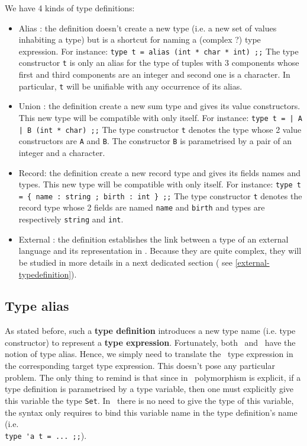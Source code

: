 We have 4 kinds of type definitions:
\begin{itemize}
  \item Alias : the definition doesn't create a new type (i.e. a new
    set of values inhabiting a type) but is a shortcut for naming a
    (complex ?) type expression. For instance:
    {\footnotesize\lstinline!type t = alias (int * char * int) ;;!}
    The type constructor {\tt t} is only an alias for the type of
    tuples with 3 components whose first and third components are an
    integer and second one is a character. In particular, {\tt t} will
    be unifiable with any occurrence of its alias. 
  \item Union : the definition create a new sum type and gives its
    value constructors. This new type will be compatible with only
    itself. For instance:
    {\footnotesize\lstinline!type t = | A | B (int * char) ;;!}
    The type constructor {\tt t} denotes the type whose 2 value
    constructors are {\tt A} and {\tt B}. The constructor {\tt B} is
    parametrised by a pair of an integer and a character.
\item Record: the definition create a new record type and gives its
  fields names and types. This new type will be compatible with only
    itself. For instance:
    {\footnotesize\lstinline!type t = { name : string ; birth : int } ;;!}
    The type constructor {\tt t} denotes the record type whose 2
    fields are named {\tt name} and {\tt birth} and types are
    respectively {\tt string} and {\tt int}.
  \item External : the definition establishes the link between a type
    of an external language and its representation in
    \focalize. Because they are quite complex, they will be studied in
    more details in a next dedicated section (
    see \ref{external-typedefinition}).
\end{itemize}


\subsection{Type alias}
As stated before, such a {\bf type definition} introduces a new type
name (i.e. type constructor) to represent a
{\bf type expression}. Fortunately, both \ocaml\ and \coq\ have the
notion of type alias. Hence, we simply need to translate the
\focalize\ type expression in the corresponding target type
expression. This doesn't pose any particular problem. The only thing
to remind is that since in \coq\ polymorphism is explicit, if a type
definition is parametrised by a type variable, then one must
explicitly give this variable the type {\tt Set}. In \ocaml\, there
is no need to give the type of this variable, the syntax only requires
to bind this variable name in the type definition's name (i.e. \\
\lstinline!type 'a t = ... ;;!).

